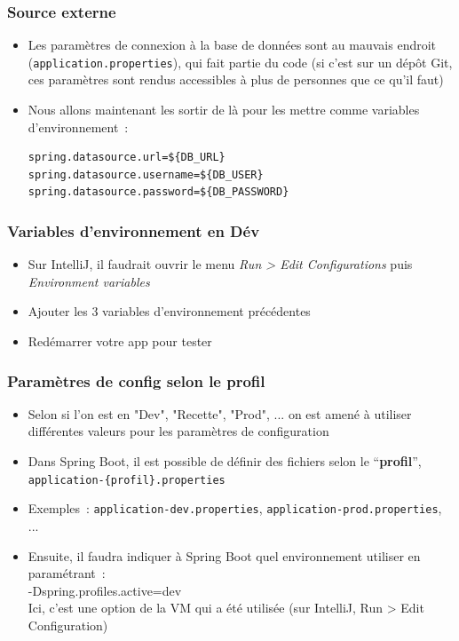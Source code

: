 \documentclass{beamer}
\begin{document}
\begin{frame}[fragile]
	\frametitle{Source externe}
	\begin{itemize}
		\item Les paramètres de connexion à la base de données sont au mauvais endroit (\texttt{application.properties}), qui fait partie du code (si c'est sur un dépôt Git, ces paramètres sont rendus accessibles à plus de personnes que ce qu'il faut)
		\item Nous allons maintenant les sortir de là pour les mettre comme variables d'environnement~:
\begin{lstlisting}
spring.datasource.url=${DB_URL}
spring.datasource.username=${DB_USER}
spring.datasource.password=${DB_PASSWORD}
\end{lstlisting}
	\end{itemize}
\end{frame} 

\begin{frame}[fragile]
	\frametitle{Variables d'environnement en Dév}
	\begin{itemize}
		\item Sur IntelliJ, il faudrait ouvrir le menu \textit{Run > Edit Configurations} puis \textit{Environment variables}
		\item Ajouter les 3 variables d'environnement précédentes
		\item Redémarrer votre app pour tester
	\end{itemize}
\end{frame}

\begin{frame}[fragile]
	\frametitle{Paramètres de config selon le profil}
	\begin{itemize}
		\item Selon si l'on est en "Dev", "Recette", "Prod", ... on est amené à utiliser différentes valeurs pour les paramètres de configuration
		\item Dans Spring Boot, il est possible de définir des fichiers selon le ``\textbf{profil}'', \texttt{application-\{profil\}.properties}
		\item Exemples~: \texttt{application-dev.properties}, \texttt{application-prod.properties}, ...
		\item Ensuite, il faudra indiquer à Spring Boot quel environnement utiliser en paramétrant~:\\
		 -Dspring.profiles.active=dev\\
		 Ici, c'est une option de la VM qui a été utilisée (sur IntelliJ, Run > Edit Configuration)
	\end{itemize}
\end{frame} 
\end{document}
